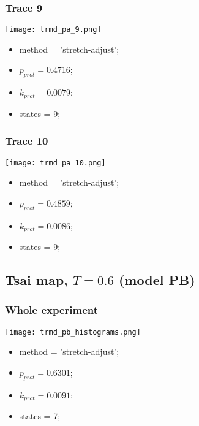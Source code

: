 \subsubsection{Trace 9}
\begin{minipage}[c]{0.7\textwidth}
    \texttt{[image: trmd\_pa\_9.png]}
\end{minipage}
\hfill
\begin{minipage}[c]{0.45\textwidth}
    \begin{itemize}
        \item method = 'stretch-adjust';
        \item $p_{prot}=0.4716$;
        \item $k_{prot}=0.0079$;
        \item states = 9;
    \end{itemize}
\end{minipage}

\subsubsection{Trace 10}
\begin{minipage}[c]{0.7\textwidth}
    \texttt{[image: trmd\_pa\_10.png]}
\end{minipage}
\hfill
\begin{minipage}[c]{0.45\textwidth}
    \begin{itemize}
        \item method = 'stretch-adjust';
        \item $p_{prot}=0.4859$;
        \item $k_{prot}=0.0086$;
        \item states = 9;
    \end{itemize}
\end{minipage}



\subsection{Tsai map, $T=0.6$ (model PB)}
\subsubsection{Whole experiment}
\begin{minipage}[c]{0.7\textwidth}
    \texttt{[image: trmd\_pb\_histograms.png]}
\end{minipage}
\hfill
\begin{minipage}[c]{0.45\textwidth}
    \begin{itemize}
        \item method = 'stretch-adjust';
        \item $p_{prot}=0.6301$;
        \item $k_{prot}=0.0091$;
        \item states = 7;
    \end{itemize}
\end{minipage}


